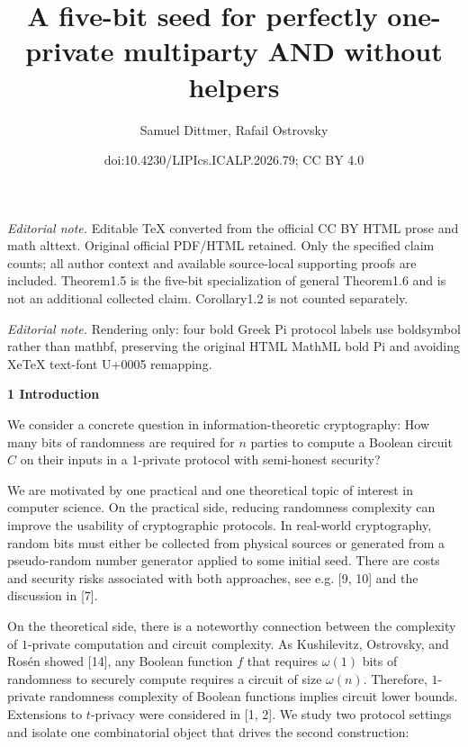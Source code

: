 \documentclass[10pt,a4paper]{article}
\title{A five-bit seed for perfectly one-private multiparty AND without helpers}
\author{Samuel Dittmer, Rafail Ostrovsky}
\date{doi:10.4230/LIPIcs.ICALP.2026.79; CC BY 4.0}
\begin{document}
\maketitle
\noindent\textit{Editorial note.} Editable TeX converted from the official CC BY HTML prose and math alttext. Original official PDF/HTML retained. Only the specified claim counts; all author context and available source-local supporting proofs are included. Theorem1.5 is the five-bit specialization of general Theorem1.6 and is not an additional collected claim. Corollary1.2 is not counted separately.\par\medskip
\noindent\textit{Editorial note.} Rendering only: four bold Greek Pi protocol labels use boldsymbol rather than mathbf, preserving the original HTML MathML bold Pi and avoiding XeTeX text-font U+0005 remapping.\par\medskip


\par\medskip\noindent\textbf{
1 Introduction}\par




We consider a concrete question in information-theoretic cryptography: How many bits of randomness are required for $n$ parties to compute a Boolean circuit $C$ on their inputs in a $1$-private protocol with semi-honest security?\par




We are motivated by one practical and one theoretical topic of interest in computer science. On the practical side, reducing randomness complexity can improve the usability of cryptographic protocols. In real-world cryptography, random bits must either be collected from physical sources or generated from a pseudo-random number generator applied to some initial seed. There are costs and security risks associated with both approaches, see e.g. [9, 10] and the discussion in [7].\par




On the theoretical side, there is a noteworthy connection between the complexity of $1$-private computation and circuit complexity. As Kushilevitz, Ostrovsky, and Rosén showed [14], any Boolean function $f$ that requires $\omega(1)$ bits of randomness to securely compute requires a circuit of size $\omega(n)$. Therefore, $1$-private randomness complexity of Boolean functions implies circuit lower bounds. Extensions to $t$-privacy were considered in [1, 2].
We study two protocol settings and isolate one combinatorial object that drives the second construction:\par
\end{document}
